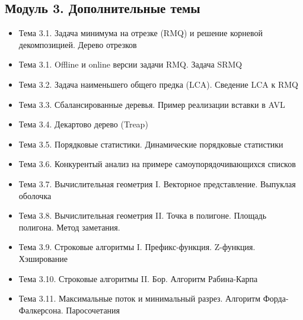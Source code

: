 \documentclass[a4paper,11pt]{article}
\begin{document}
\subsection*{Модуль 3. Дополнительные темы}
\begin{itemize}
\item Тема 3.1. Задача минимума на отрезке (RMQ) и решение корневой
декомпозицией. Дерево отрезков
\item Тема 3.1. Offline и online версии задачи RMQ. Задача SRMQ
\item Тема 3.2. Задача наименьшего общего предка (LCA). Сведение LCA к RMQ
\item Тема 3.3. Сбалансированные деревья. Пример реализации вставки в AVL
\item Тема 3.4. Декартово дерево (Treap)
\item Тема 3.5. Порядковые статистики. Динамические порядковые статистики
\item Тема 3.6. Конкурентый анализ на примере самоупорядочивающихся списков
\item Тема 3.7. Вычислительная геометрия I. Векторное представление. Выпуклая 
оболочка
\item Тема 3.8. Вычислительная геометрия II. Точка в полигоне. Площадь 
полигона. Метод заметания.
\item Тема 3.9. Строковые алгоритмы I. Префикс-функция. Z-функция. Хэширование
\item Тема 3.10. Строковые алгоритмы II. Бор. Алгоритм Рабина-Карпа
\item Тема 3.11. Максимальные поток и минимальный разрез. Алгоритм 
Форда-Фалкерсона. Паросочетания
\end{itemize}
\end{document}
